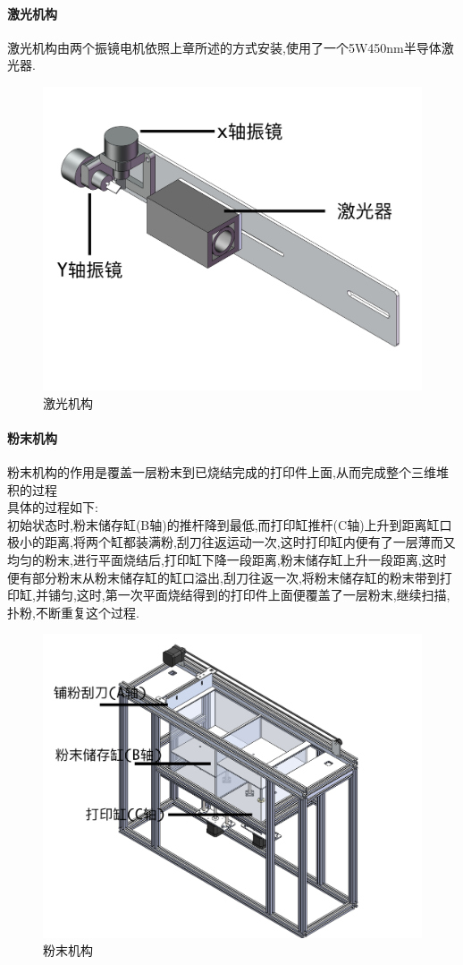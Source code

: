 \documentclass[a4paper,12pt,onecolumn,twoside]{article}
\begin{document}
\paragraph{激光机构}
激光机构由两个振镜电机依照上章所述的方式安装,使用了一个5W450nm半导体激光器.
\begin{figure}[ht]
\centering
\includegraphics[width=\linewidth]{MGSLS3_2.png}
\caption{激光机构}
\end{figure}
\paragraph{粉末机构}
粉末机构的作用是覆盖一层粉末到已烧结完成的打印件上面,从而完成整个三维堆积的过程\\
具体的过程如下:\\初始状态时,粉末储存缸(B轴)的推杆降到最低,而打印缸推杆(C轴)上升到距离缸口极小的距离,将两个缸都装满粉,刮刀往返运动一次,这时打印缸内便有了一层薄而又均匀的粉末,进行平面烧结后,打印缸下降一段距离,粉末储存缸上升一段距离,这时便有部分粉末从粉末储存缸的缸口溢出,刮刀往返一次,将粉末储存缸的粉末带到打印缸,并铺匀,这时,第一次平面烧结得到的打印件上面便覆盖了一层粉末,继续扫描,扑粉,不断重复这个过程.
\begin{figure}[ht]
\centering
\includegraphics[width=0.75\linewidth]{MGSLS3_1.png}
\caption{ 粉末机构}
\end{figure}
\newpage
\end{document}
